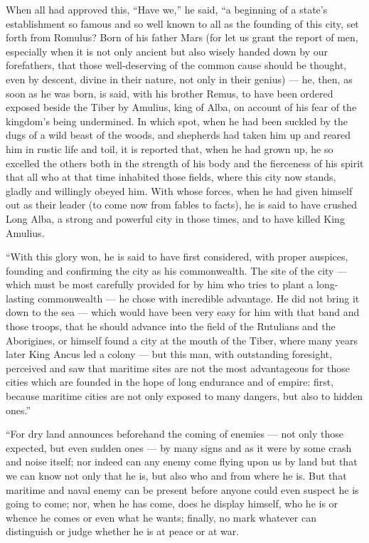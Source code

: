  When all had approved this, ``Have we,'' he said, ``a beginning of a state's establishment so famous and so well known to all as the founding of this city, set forth from Romulus? Born of his father Mars (for let us grant the report of men, especially when it is not only ancient but also wisely handed down by our forefathers, that those well-deserving of the common cause should be thought, even by descent, divine in their nature, not only in their genius) --- he, then, as soon as he was born, is said, with his brother Remus, to have been ordered exposed beside the Tiber by Amulius, king of Alba, on account of his fear of the kingdom's being undermined. In which spot, when he had been suckled by the dugs of a wild beast of the woods, and shepherds had taken him up and reared him in rustic life and toil, it is reported that, when he had grown up, he so excelled the others both in the strength of his body and the fierceness of his spirit that all who at that time inhabited those fields, where this city now stands, gladly and willingly obeyed him. With whose forces, when he had given himself out as their leader (to come now from fables to facts), he is said to have crushed Long Alba, a strong and powerful city in those times, and to have killed King Amulius.

 ``With this glory won, he is said to have first considered, with proper auspices, founding and confirming the city as his commonwealth. The site of the city --- which must be most carefully provided for by him who tries to plant a long-lasting commonwealth --- he chose with incredible advantage. He did not bring it down to the sea --- which would have been very easy for him with that band and those troops, that he should advance into the field of the Rutulians and the Aborigines, or himself found a city at the mouth of the Tiber, where many years later King Ancus led a colony --- but this man, with outstanding foresight, perceived and saw that maritime sites are not the most advantageous for those cities which are founded in the hope of long endurance and of empire: first, because maritime cities are not only exposed to many dangers, but also to hidden ones.''

 ``For dry land announces beforehand the coming of enemies --- not only those expected, but even sudden ones --- by many signs and as it were by some crash and noise itself; nor indeed can any enemy come flying upon us by land but that we can know not only that he is, but also who and from where he is. But that maritime and naval enemy can be present before anyone could even suspect he is going to come; nor, when he has come, does he display himself, who he is or whence he comes or even what he wants; finally, no mark whatever can distinguish or judge whether he is at peace or at war.

